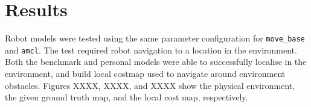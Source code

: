 \documentclass[a4paper]{article}
\begin{document}
\section{Results}
Robot models were tested using the same parameter configuration for \texttt{move\_base} and \texttt{amcl}. The test required robot navigation to a location in the environment. Both the benchmark and personal models were able to successfully localise in the environment, and build local costmap used to navigate around environment obstacles. Figures XXXX, XXXX, and XXXX show the physical environment, the given ground truth map, and the local cost map, respectively.\\

\begin{minipage}{0.45\textwidth}
\centering
{}
\end{minipage}
\hspace{1cm}
\begin{minipage}{0.45\textwidth}
\centering
{}
\end{minipage}

\begin{figure}[h]
\centering
{}
\end{figure}
\end{document}
